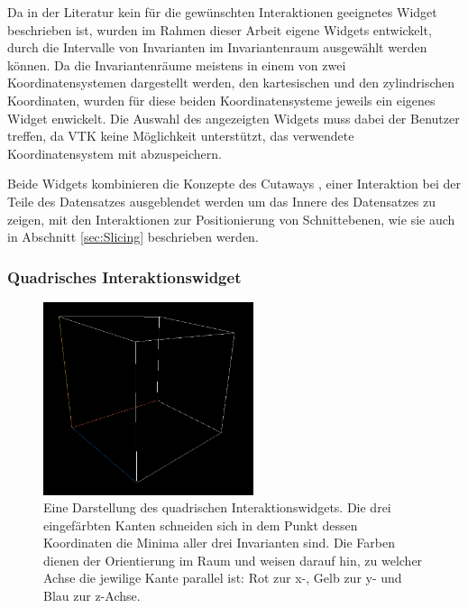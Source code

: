 \documentclass[a4paper,fontsize=12pt,toc=bib,halfparskip]{scrartcl}
\begin{document}
Da in der Literatur kein f\"ur die gew\"unschten Interaktionen geeignetes Widget beschrieben ist, wurden im Rahmen dieser Arbeit eigene Widgets entwickelt, durch die Intervalle von Invarianten im Invariantenraum ausgew\"ahlt werden k\"onnen. Da die Invariantenr\"aume meistens in einem von zwei Koordinatensystemen dargestellt werden, den kartesischen und den zylindrischen Koordinaten, wurden f\"ur diese beiden Koordinatensysteme jeweils ein eigenes Widget enwickelt. Die Auswahl des angezeigten Widgets muss dabei der Benutzer treffen, da VTK keine M\"oglichkeit unterst\"utzt, das verwendete Koordinatensystem mit abzuspeichern.

Beide Widgets kombinieren die Konzepte des Cutaways \cite[S.~406~f.]{preim2015interaktive}, einer Interaktion bei der Teile des Datensatzes ausgeblendet werden um das Innere des Datensatzes zu zeigen, mit den Interaktionen zur Positionierung von Schnittebenen, wie sie auch in Abschnitt \ref{sec:Slicing} beschrieben werden. 

\subsubsection{Quadrisches Interaktionswidget}

\begin{figure}
	\centering
	\includegraphics[width=0.55\textwidth]{pictures/QuadricInteractions.png}
	\caption{Eine Darstellung des quadrischen Interaktionswidgets. Die drei eingef\"arbten Kanten schneiden sich in dem Punkt dessen Koordinaten die Minima aller drei Invarianten sind. Die Farben dienen der Orientierung im Raum und weisen darauf hin, zu welcher Achse die jewilige Kante parallel ist: Rot zur x-, Gelb zur y- und Blau zur z-Achse.}
	\label{CubicalInteractions}
\end{figure}
\end{document}
